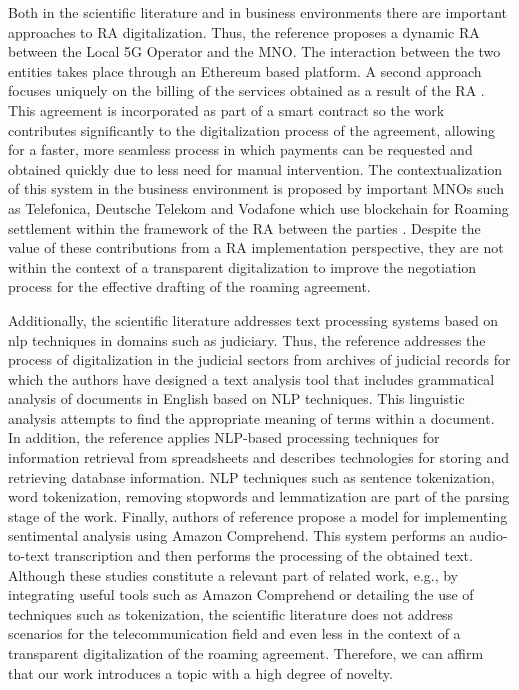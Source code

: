 \documentclass[conference]{style/IEEEtran}
\begin{document}
Both in the scientific literature and in business environments there are important approaches to RA digitalization. Thus, the reference \cite{9369516} proposes a dynamic RA between the Local 5G Operator and the MNO. The interaction between the two entities takes place through an Ethereum based platform. A second approach focuses uniquely on the billing of the services obtained as a result of the RA \cite{9024541}. This agreement is incorporated as part of a smart contract so the work contributes significantly to the digitalization process of the agreement, allowing for a faster, more seamless process in which payments can be requested and obtained quickly due to less need for manual intervention. The contextualization of this system in the business environment is proposed by important MNOs such as Telefonica, Deutsche Telekom and Vodafone which use blockchain for Roaming settlement within the framework of the RA between the parties \cite{Huillet2020}. Despite the value of these contributions from a RA implementation perspective, they are not within the context of a transparent digitalization to improve the negotiation process for the effective drafting of the roaming agreement. 

Additionally, the scientific literature addresses text processing systems based on nlp techniques in domains such as judiciary. Thus, the reference \cite{8487847} addresses the process of digitalization in the judicial sectors from archives of judicial records for which the authors have designed a text analysis tool that includes grammatical analysis of documents in English based on NLP techniques. This linguistic analysis attempts to find the appropriate meaning of terms within a document. In addition, the reference \cite{9138070} applies NLP-based processing techniques for information retrieval from spreadsheets and describes technologies for storing and retrieving database information. NLP techniques such as sentence tokenization, word tokenization, removing stopwords and lemmatization are part of the parsing stage of the work. Finally, authors of reference \cite{9104105} propose a model for implementing sentimental analysis using Amazon Comprehend. This system performs an audio-to-text transcription and then performs the processing of the obtained text. Although these studies  constitute a relevant part of related work, e.g., by integrating useful tools such as Amazon Comprehend or detailing the use of techniques such as tokenization, the scientific literature does not address scenarios for the telecommunication field and even less in the context of a transparent digitalization of the roaming agreement. Therefore, we can affirm that our work introduces a topic with a high degree of novelty.
\end{document}
